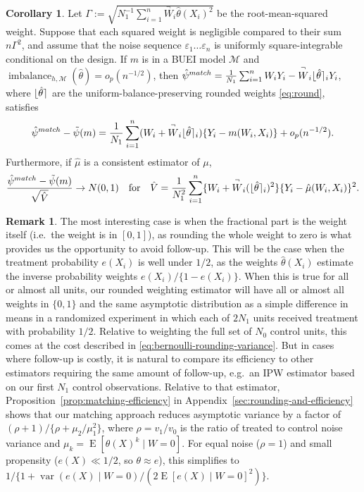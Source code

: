 \documentclass{article}
\theoremstyle{definition}
\newtheorem{corollary}[theorem]{Corollary}
\newtheorem{remark}{Remark}
\DeclareMathOperator{\E}{E}
\DeclareMathOperator{\Var}{var}
\DeclarePairedDelimiter\round{\lfloor}{\rceil}
\newcommand{\estimand}{\psi}
\DeclareMathOperator{\imbalance}{imbalance}
\newcommand{\htheta}{\hat\theta}
\newcommand{\model}{\mathcal{M}}
\newcommand{\<}{\langle}
\renewcommand{\>}{\rangle}
\begin{document}
\begin{corollary}
\label{cor:rounding}
Let $\Gamma :=  \sqrt{N_1^{-1}\sum_{i=1}^n \overset{\neg}W_i \htheta(X_i)^2}$ be the root-mean-squared weight. Suppose that each squared weight is negligible compared to their sum $n\Gamma^2$, and assume that the noise sequence $\varepsilon_1 \ldots \varepsilon_n$ is uniformly square-integrable conditional on the design.
If $m$ is in a BUEI model $\model$ and $\imbalance_{h,\model}(\htheta) = o_p(n^{-1/2})$,
then $\hat\psi^{match}=\frac{1}{N_1}\sum_{i=1}^n W_iY_i - \overset{\neg}W_i \round{\htheta}_i Y_i$, where $\round{\htheta}$ are the uniform-balance-preserving rounded weights \eqref{eq:round}, satisfies
\begin{equation}
\label{eq:asymptotic-linearity-rounded}
\hat\psi^{match}-\tilde\psi(m) = \frac{1}{N_1} \sum_{i=1}^{n}(W_i + \overset{\neg} W_i \round{\htheta}_i)\{ Y_i - m(W_i,X_i) \} + o_p(n^{-1/2}).
\end{equation}
Furthermore, if $\hat \mu$ is a consistent estimator of $\mu$,
 \begin{equation}
 \label{eq:asymptotic-normality-rounded}
  \frac{\hat\psi^{match} - \tilde\estimand(m)}{\sqrt{\hat V}} \to N(0,1) \quad \text{for} \quad
 \hat V = \frac{1}{N_1^2}\sum_{i=1}^n \{W_i + \overset{\neg}{W}_i (\round{\htheta}_i)^2\} \{Y_i - \hat \mu(W_i, X_i)\}^2.
\end{equation}
\end{corollary}

\begin{remark}
\label{rem:matching-variance}
The most interesting case is when the fractional part is the weight itself (i.e.\ the weight is in $[0,1]$), as rounding the whole weight to zero is what provides us the opportunity to avoid follow-up. This will be the case when the treatment probability $e(X_i)$ is well under $1/2$, as the weights $\hat\theta(X_i)$ estimate the inverse probability weights $e(X_i)/\{1-e(X_i)\}$. When this is true for all or almost all units, our rounded weighting estimator will have all or almost all weights in $\{0,1\}$ and the same asymptotic distribution as a simple difference in means in a randomized experiment in which each of $2N_1$ units received treatment with probability $1/2$. Relative to weighting the full set of $N_0$ control units, this comes at the cost described in \eqref{eq:bernoulli-rounding-variance}. But in cases where follow-up is costly, it is natural to compare its efficiency to other estimators requiring the same amount of follow-up, e.g.\ an IPW estimator based on our first $N_1$ control observations. Relative to that estimator, Proposition~\ref{prop:matching-efficiency} in Appendix~\ref{sec:rounding-and-efficiency} shows that our matching approach reduces asymptotic variance by a factor of $(\rho+1)/\{\rho + \mu_2/\mu_1^2\}$, where $\rho = v_1/v_0$ is the ratio of treated to control noise variance and $\mu_k = \E[\theta(X)^k \mid W=0]$. For equal noise ($\rho=1$) and small propensity ($e(X) \ll 1/2$, so $\theta \approx e$), this simplifies to $1/\{1+\Var(e(X)\mid W=0)/(2\E[e(X)\mid W=0]^2)\}$.
\end{remark}
\end{document}

